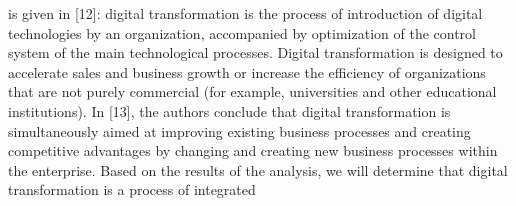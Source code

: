 \documentclass{article}
\begin{document}
\begin{multicols}{2}
\begin{itemize}
is given in [12]: digital transformation is the process of introduction of digital technologies by an
organization, accompanied by optimization of the
control system of the main technological processes.
Digital transformation is designed to accelerate sales
and business growth or increase the efficiency of
organizations that are not purely commercial (for
example, universities and other educational institutions). In [13], the authors conclude that digital transformation is simultaneously aimed at improving existing business processes and creating
competitive advantages by changing and creating
new business processes within the enterprise. Based
on the results of the analysis, we will determine
that digital transformation is a process of integrated
\end{itemize}
\end{multicols}
\end{document}
